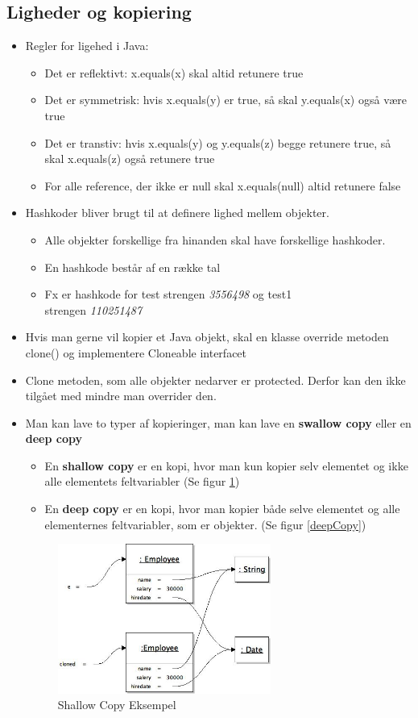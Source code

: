 \documentclass{article}
\begin{document}
\subsection{Ligheder og kopiering}
\begin{itemize}
	\item Regler for ligehed i Java:
	\begin{itemize}
		\item Det er reflektivt: x.equals(x) skal altid retunere true
		\item Det er symmetrisk: hvis x.equals(y) er true, så skal y.equals(x) også være true
		\item Det er transtiv: hvis x.equals(y) og y.equals(z) begge retunere true, så skal x.equals(z) også retunere true
		\item For alle reference, der ikke er null skal x.equals(null) altid retunere false
	\end{itemize}
	\item Hashkoder bliver brugt til at definere lighed mellem objekter.
	\begin{itemize}
		\item Alle objekter forskellige fra hinanden skal have forskellige hashkoder.
		\item En hashkode består af en række tal
		\item Fx er hashkode for test strengen \textit{3556498} og test1 \\ strengen \textit{110251487}
	\end{itemize}
	\item Hvis man gerne vil kopier et Java objekt, skal en klasse override metoden clone() og implementere Cloneable interfacet
	\item Clone metoden, som alle objekter nedarver er protected. Derfor kan den ikke tilgået med mindre man overrider den. 
	\item Man kan lave to typer af kopieringer, man kan lave en \textbf{swallow copy} eller en \textbf{deep copy}
	\begin{itemize}
		\item En \textbf{shallow copy} er en kopi, hvor man kun kopier selv elementet og ikke alle elementets feltvariabler (Se figur \ref{shallowCopy})
		\item En \textbf{deep copy} er en kopi, hvor man kopier både selve elementet og alle elementernes feltvariabler, som er objekter. (Se figur \ref{deepCopy})
	\end{itemize}
	\begin{figure}[ht!]
		\centering
		\includegraphics[width=70mm]{img/ShallowCopy.jpeg}
		\caption{Shallow Copy Eksempel\label{shallowCopy}}
	\end{figure}


\end{itemize}
\end{document}
